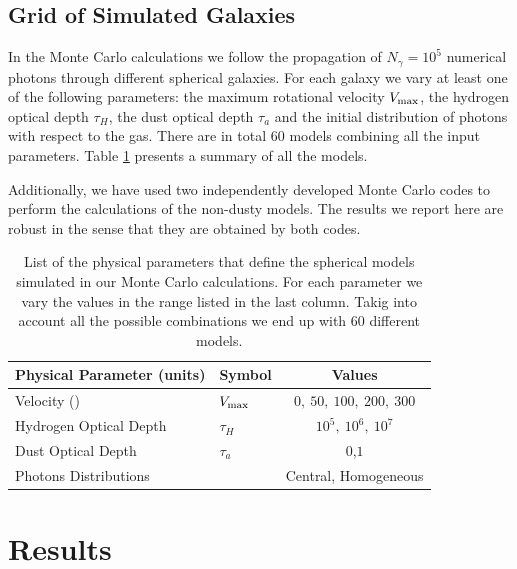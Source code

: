 \documentclass[usenatbib]{mn2e}
\newcommand{\kms}{{\ifmmode{{\mathrm{\,km\ s}^{-1}}}\else{\,km~s$^{-1}$}\fi}}
\begin{document}
\subsection{Grid of Simulated Galaxies}
\label{sec:models}

In the Monte Carlo calculations we follow the propagation of $N_{\gamma}=10^5$
numerical photons through different spherical galaxies. For each galaxy
we vary at least one of the following parameters: the maximum
rotational velocity $V_{\rm max}$, the hydrogen optical depth $\tau_{H}$,
the dust optical depth $\tau_{a}$ and the initial distribution of photons
with respect to the gas. There are in total $60$ models combining all
the input parameters. Table \ref{table:models} presents a summary of
all the models.


Additionally, we have used two independently developed Monte Carlo
codes \citep{CLARA,DijkstraKramer} to perform the calculations of the
non-dusty models. The results we report here are robust in the sense
that they are obtained by both codes. 

\begin{table}
\begin{center}
\begin{tabular}{llc}\hline\hline
Physical Parameter (units) & Symbol & Values\\\hline
Velocity (\kms) & $V_{\rm max}$&$0,\ 50,\ 100,\ 200,\ 300$\\
Hydrogen Optical Depth & $\tau_{H} $ & $10^{5},\ 10^{6},\ 10^{7}$\\
Dust Optical Depth & $\tau_{a}$ & $0$,$1$\\
Photons Distributions & & Central, Homogeneous\\\hline\hline
\end{tabular}
\caption{
  List of the physical parameters that define the spherical models 
  simulated in our Monte Carlo calculations. For each parameter we
  vary the values in the range listed in the last column. Takig into
  account all the possible combinations we end up with $60$ different
  models.} 
\label{table:models}
\end{center}
\end{table}


\section{Results}
\label{sec:results}
\end{document}
